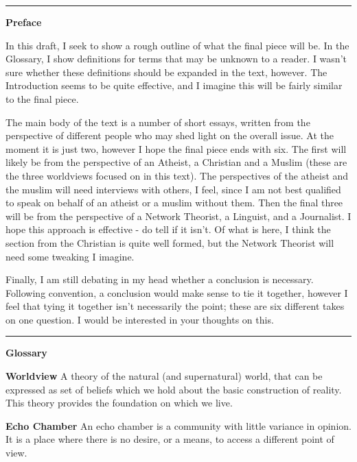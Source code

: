 \documentclass[]{article}
\date{}
\begin{document}
\autocite{}

\autocite[pg]{}

\begin{center}\rule{0.5\linewidth}{\linethickness}\end{center}

\textbf{Preface}

In this draft, I seek to show a rough outline of what the final piece
will be. In the Glossary, I show definitions for terms that may be
unknown to a reader. I wasn't sure whether these definitions should be
expanded in the text, however. The Introduction seems to be quite
effective, and I imagine this will be fairly similar to the final piece.

The main body of the text is a number of short essays, written from the
perspective of different people who may shed light on the overall issue.
At the moment it is just two, however I hope the final piece ends with
six. The first will likely be from the perspective of an Atheist, a
Christian and a Muslim (these are the three worldviews focused on in
this text). The perspectives of the atheist and the muslim will need
interviews with others, I feel, since I am not best qualified to speak
on behalf of an atheist or a muslim without them. Then the final three
will be from the perspective of a Network Theorist, a Linguist, and a
Journalist. I hope this approach is effective - do tell if it isn't. Of
what is here, I think the section from the Christian is quite well
formed, but the Network Theorist will need some tweaking I imagine.

Finally, I am still debating in my head whether a conclusion is
necessary. Following convention, a conclusion would make sense to tie it
together, however I feel that tying it together isn't necessarily the
point; these are six different takes on one question. I would be
interested in your thoughts on this.

\begin{center}\rule{0.5\linewidth}{\linethickness}\end{center}

\textbf{Glossary}

\textbf{Worldview} A theory of the natural (and supernatural) world,
that can be expressed as set of beliefs which we hold about the basic
construction of reality. This theory provides the foundation on which we
live.

\textbf{Echo Chamber} An echo chamber is a community with little
variance in opinion. It is a place where there is no desire, or a means,
to access a different point of view.\autocite{Thwaitenewtheoryecho2018}
\end{document}
